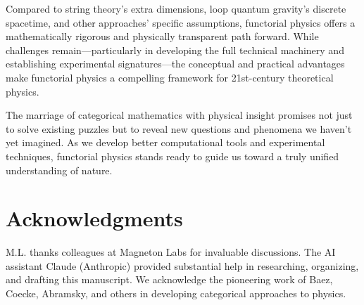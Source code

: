 \documentclass[11pt,a4paper]{article}
\begin{document}
Compared to string theory's extra dimensions, loop quantum gravity's discrete spacetime, and other approaches' specific assumptions, functorial physics offers a mathematically rigorous and physically transparent path forward. While challenges remain---particularly in developing the full technical machinery and establishing experimental signatures---the conceptual and practical advantages make functorial physics a compelling framework for 21st-century theoretical physics.

The marriage of categorical mathematics with physical insight promises not just to solve existing puzzles but to reveal new questions and phenomena we haven't yet imagined. As we develop better computational tools and experimental techniques, functorial physics stands ready to guide us toward a truly unified understanding of nature.

\section*{Acknowledgments}

M.L. thanks colleagues at Magneton Labs for invaluable discussions. The AI assistant Claude (Anthropic) provided substantial help in researching, organizing, and drafting this manuscript. We acknowledge the pioneering work of Baez, Coecke, Abramsky, and others in developing categorical approaches to physics.
\end{document}
